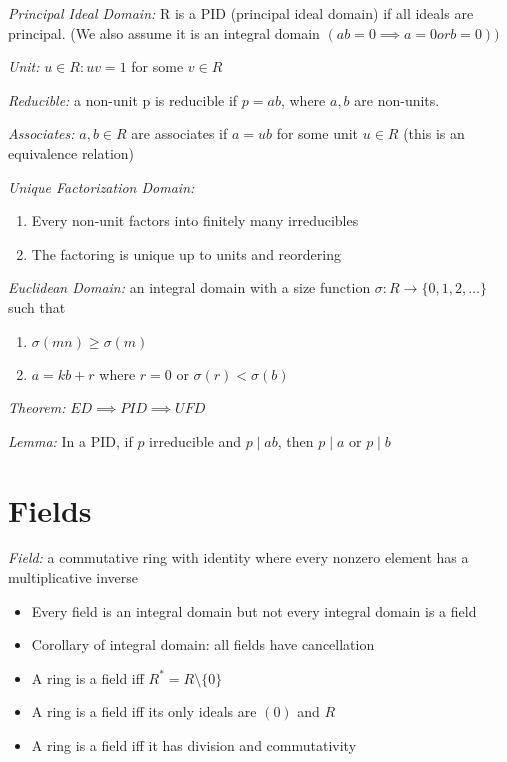 \documentclass[9pt]{memoir}
\begin{document}
\begin{multicols}{2}
    \emph{Principal Ideal Domain:} R is a PID (principal ideal domain) if all ideals are principal. (We also assume it is an integral domain $(ab = 0 \implies a = 0 or b = 0))$
   
    \emph{Unit:} $u \in R: uv = 1$ for some $v \in R$

    \emph{Reducible:} a non-unit p is reducible if $p = ab$, where $a,b$ are non-units.

    \emph{Associates:} $a, b \in R$ are associates if $a = ub$ for some unit $u \in R$ (this is an equivalence relation)

    \emph{Unique Factorization Domain:} 
    \begin{enumerate}
        \item Every non-unit factors into finitely many irreducibles 
        \item The factoring is unique up to units and reordering 
    \end{enumerate}

    \emph{Euclidean Domain:} an integral domain with a size function $\sigma: R \to \{0, 1, 2, \dots\}$ such that 
    \begin{enumerate}
        \item $\sigma(mn) \geq \sigma(m)$
        \item $a = kb + r$ where $r = 0$ or $\sigma(r) < \sigma(b)$
    \end{enumerate}

    \emph{Theorem:} $ED \implies PID \implies UFD$ 

    \emph{Lemma:} In a PID, if $p$ irreducible and $p \mid ab$, then $p \mid a$ or $p \mid b$

\section*{Fields}
    \emph{Field:} a commutative ring with identity where every nonzero element has a multiplicative inverse
    \begin{itemize}
        \item Every field is an integral domain but not every integral domain is a field
        \item Corollary of integral domain: all fields have cancellation
        \item A ring is a field iff $R^* = R \setminus \{0\}$
        \item A ring is a field iff its only ideals are $(0)$ and $R$
        \item A ring is a field iff it has division and commutativity
    \end{itemize}


\end{multicols}
\end{document}
